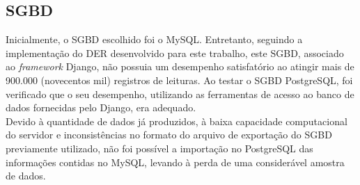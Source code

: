 \subsection{\acrlong{SGBD}}
\quad Inicialmente, o \acrshort{SGBD} escolhido foi o MySQL. Entretanto, seguindo a implementação do \acrshort{DER} desenvolvido para este trabalho, este \acrlong{SGBD}, associado ao \textit{framework} Django, não possuia um desempenho satisfatório ao atingir mais de 900.000 (novecentos mil) registros de leituras. Ao testar o \acrshort{SGBD} PostgreSQL, foi verificado que o seu desempenho, utilizando as ferramentas de acesso ao banco de dados fornecidas pelo Django, era adequado.
\\\null \quad Devido à quantidade de dados já produzidos, à baixa capacidade computacional do servidor e  inconsistências no formato do arquivo de exportação do \acrshort{SGBD} previamente utilizado, não foi possível a importação no PostgreSQL das informações contidas no MySQL, levando à perda de uma considerável amostra de dados.
